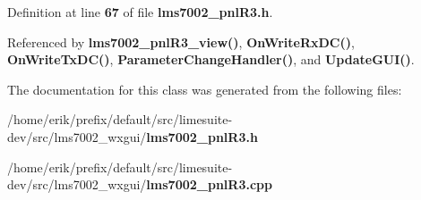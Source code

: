 Definition at line {\bf 67} of file {\bf lms7002\+\_\+pnl\+R3.\+h}.



Referenced by {\bf lms7002\+\_\+pnl\+R3\+\_\+view()}, {\bf On\+Write\+Rx\+D\+C()}, {\bf On\+Write\+Tx\+D\+C()}, {\bf Parameter\+Change\+Handler()}, and {\bf Update\+G\+U\+I()}.



The documentation for this class was generated from the following files\+:\begin{DoxyCompactItemize}
\item 
/home/erik/prefix/default/src/limesuite-\/dev/src/lms7002\+\_\+wxgui/{\bf lms7002\+\_\+pnl\+R3.\+h}\item 
/home/erik/prefix/default/src/limesuite-\/dev/src/lms7002\+\_\+wxgui/{\bf lms7002\+\_\+pnl\+R3.\+cpp}\end{DoxyCompactItemize}
